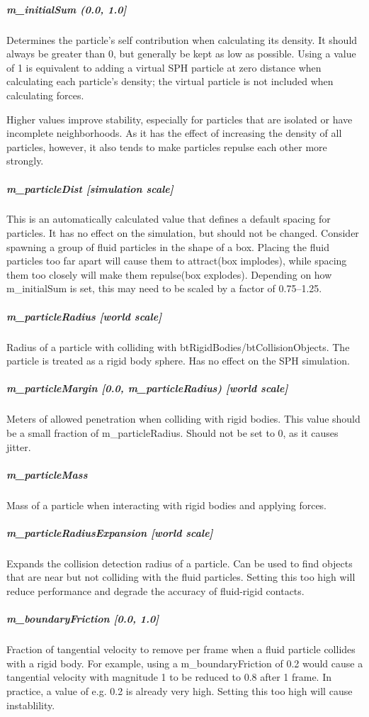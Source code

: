 \documentclass[]{article}
\begin{document}
		\subparagraph{m\_initialSum (0.0, 1.0]}
			Determines the particle's self contribution when calculating its density. It should always be greater than 0,
			but generally be kept as low as possible. Using a value of 1 is equivalent to adding a virtual SPH particle at zero distance
			when calculating each particle's density; the virtual particle is not included when calculating forces.
			
			Higher values improve stability, especially for particles that are isolated or have incomplete neighborhoods. 
			As it has the effect of increasing the density of all particles, however, it also tends to make particles repulse
			each other more strongly.
			
		\subparagraph{m\_particleDist [simulation scale]}
			This is an automatically calculated value that defines a default spacing for particles. It has no effect on
			the simulation, but should not be changed. Consider spawning a group of fluid particles in the shape of a 
			box. Placing the fluid particles too far apart will cause them to attract(box implodes), while spacing them
			too closely will make them repulse(box explodes). Depending on how m\_initialSum is set, this may need to
			be scaled by a factor of 0.75--1.25.
			
		\subparagraph{m\_particleRadius [world scale]}
			Radius of a particle with colliding with btRigidBodies/btCollisionObjects. The particle is treated as a rigid body sphere.
			Has no effect on the SPH simulation.
			
		\subparagraph{m\_particleMargin [0.0, m\_particleRadius) [world scale]}
			Meters of allowed penetration when colliding with rigid bodies. This value should be a small fraction of
			m\_particleRadius. Should not be set to 0, as it causes jitter.\\
			
		\subparagraph{m\_particleMass}
			Mass of a particle when interacting with rigid bodies and applying forces.
			
		\subparagraph{m\_particleRadiusExpansion [world scale]}
			Expands the collision detection radius of a particle. Can be used to find objects that are near but not
			colliding with the fluid particles. Setting this too high will reduce performance and degrade the accuracy
			of fluid-rigid contacts.
			
		\subparagraph{m\_boundaryFriction [0.0, 1.0]}
			Fraction of tangential velocity to remove per frame when a fluid particle collides with a rigid body. For 
			example, using a m\_boundaryFriction of 0.2 would cause a tangential velocity with magnitude 1 to be 
			reduced to 0.8 after 1 frame. In practice, a value of e.g. 0.2 is already very high. Setting this too high 
			will cause instablility.
			
\end{document}
